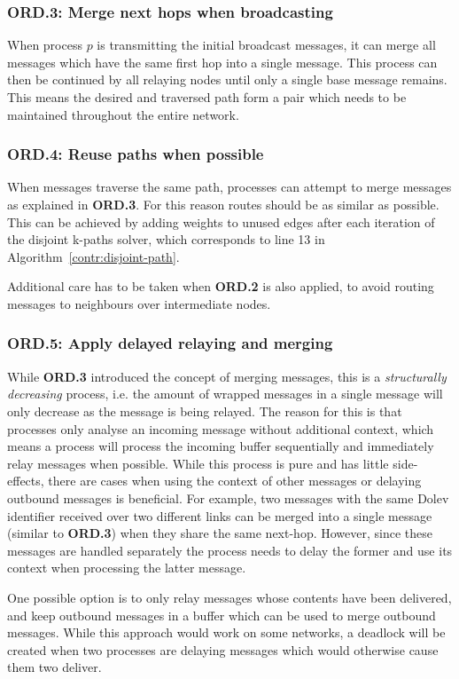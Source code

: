 \subsubsection{ORD.3: Merge next hops when broadcasting}
When process $p$ is transmitting the initial broadcast messages, it can merge all messages which have the same first hop into a single message. This process can then be continued by all relaying nodes until only a single base message remains. This means the desired and traversed path form a pair which needs to be maintained throughout the entire network. 

\subsubsection{ORD.4: Reuse paths when possible}
When messages traverse the same path, processes can attempt to merge messages as explained in \textbf{ORD.3}. For this reason routes should be as similar as possible. This can be achieved by adding weights to unused edges after each iteration of the disjoint k-paths solver, which corresponds to line 13 in Algorithm~\ref{contr:disjoint-path}.

Additional care has to be taken when \textbf{ORD.2} is also applied, to avoid routing messages to neighbours over intermediate nodes.

\subsubsection{ORD.5: Apply delayed relaying and merging}
While \textbf{ORD.3} introduced the concept of merging messages, this is a \textit{structurally decreasing} process, i.e. the amount of wrapped messages in a single message will only decrease as the message is being relayed. The reason for this is that processes only analyse an incoming message without additional context, which means a process will process the incoming buffer sequentially and immediately relay messages when possible.
While this process is pure and has little side-effects, there are cases when using the context of other messages or delaying outbound messages is beneficial. For example, two messages with the same Dolev identifier received over two different links can be merged into a single message (similar to \textbf{ORD.3}) when they share the same next-hop. However, since these messages are handled separately the process needs to delay the former and use its context when processing the latter message.

One possible option is to only relay messages whose contents have been delivered, and keep outbound messages in a buffer which can be used to merge outbound messages. While this approach would work on some networks, a deadlock will be created when two processes are delaying messages which would otherwise cause them two deliver.

